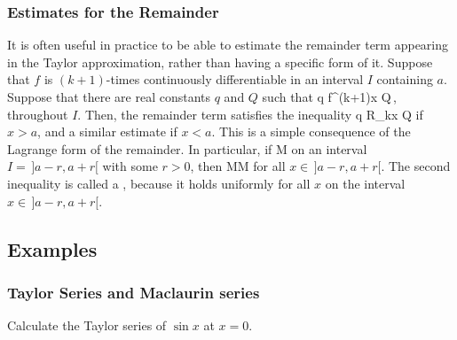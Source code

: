 \subsubsection{Estimates for the Remainder}
It is often useful in practice to be able to estimate the remainder term appearing in the Taylor approximation, rather than having a specific form of it. Suppose that $f$ is $(k+1)$-times continuously differentiable in an interval $I$ containing $a$. Suppose that there are real constants $q$ and $Q$ such that
\beq
q \leq f^{(k+1)}\vat x \leq Q\,,
\eeq
throughout $I$. Then, the remainder term satisfies the inequality
\beq
q \leq R_k\vat x \leq Q
\eeq
if $x > a$, and a similar estimate if $x < a$. This is a simple consequence of the Lagrange form of the remainder. In particular, if
\beq
{} \leq M
\eeq
on an interval $I = \, ]a-r, a+r[$ with some $r > 0$, then
\beq
{} \leq M\leq M
\eeq
for all $x\in\,]a-r, a+r[$. The second inequality is called a , because it holds uniformly for all $x$ on the interval $x\in\,]a-r, a+r[$.


\subsection{Examples}

\subsubsection{Taylor Series and Maclaurin series}
Calculate the Taylor series of $\sin x$ at $x = 0$.

